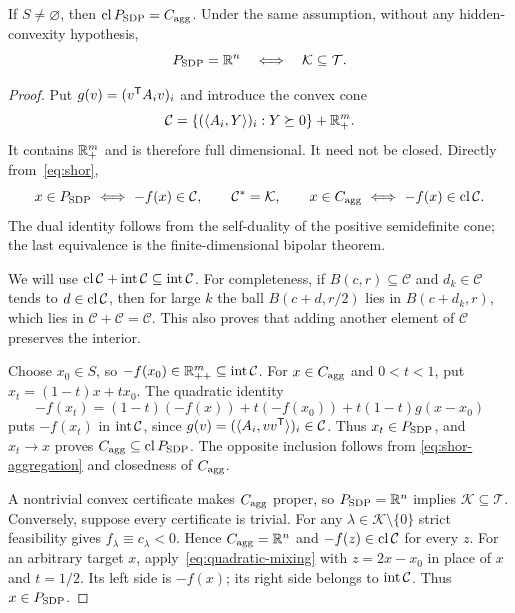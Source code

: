 \begin{proposition}\label{prop:shor-closure}
If $S\ne\varnothing$, then $\operatorname{cl} P_{\rm SDP}=C_{\rm agg}$. Under the same
assumption, without any hidden-convexity hypothesis,
\begin{equation}\label{eq:shor-whole}
 P_{\rm SDP}=\mathbb R^n\quad\Longleftrightarrow\quad
 \mathcal K\subseteq\mathcal T.
\end{equation}
\end{proposition}
\begin{proof}
Put $g(v)=(v^{\mathsf T} A_i v)_i$ and introduce the convex cone
\[
 \mathcal C=\{(\langle A_i,Y\rangle)_i:Y\succeq0\}+\mathbb R^m_+.
\]
It contains $\mathbb R^m_+$ and is therefore full dimensional. It need not
be closed. Directly from~\eqref{eq:shor},
\[
 x\in P_{\rm SDP}\ \Longleftrightarrow\ -f(x)\in\mathcal C,
 \qquad
 \mathcal C^*=\mathcal K,
 \qquad
 x\in C_{\rm agg}\ \Longleftrightarrow\ -f(x)\in\cl\mathcal C.
\]
The dual identity follows from the self-duality of the positive
semidefinite cone; the last equivalence is the finite-dimensional
bipolar theorem.

We will use
$\operatorname{cl}\mathcal C+\operatorname{int}\mathcal C\subseteq\operatorname{int}\mathcal C$.
For completeness, if $B(c,r)\subseteq\mathcal C$ and
$d_k\in\mathcal C$ tends to $d\in\operatorname{cl}\mathcal C$, then for large $k$
the ball $B(c+d,r/2)$ lies in $B(c+d_k,r)$, which lies in
$\mathcal C+\mathcal C=\mathcal C$. This also proves that adding
another element of $\mathcal C$ preserves the interior.

Choose $x_0\in S$, so $-f(x_0)\in\mathbb R^m_{++}\subseteq
\operatorname{int}\mathcal C$. For $x\in C_{\rm agg}$ and $0<t<1$, put
$x_t=(1-t)x+t x_0$. The quadratic identity
\begin{equation}\label{eq:quadratic-mixing}
 -f(x_t)=(1-t)(-f(x))+t(-f(x_0))
                         +t(1-t)g(x-x_0)
\end{equation}
puts $-f(x_t)$ in $\operatorname{int}\mathcal C$, since
$g(v)=(\langle A_i,vv^{\mathsf T}\rangle)_i\in\mathcal C$.
Thus $x_t\in P_{\rm SDP}$, and $x_t\to x$ proves
$C_{\rm agg}\subseteq\operatorname{cl} P_{\rm SDP}$. The opposite inclusion follows from
\eqref{eq:shor-aggregation} and closedness of $C_{\rm agg}$.

A nontrivial convex certificate makes $C_{\rm agg}$ proper, so
$P_{\rm SDP}=\mathbb R^n$ implies $\mathcal K\subseteq\mathcal T$.
Conversely, suppose every certificate is trivial. For any
$\lambda\in\mathcal K\setminus\{0\}$ strict feasibility gives
$f_\lambda\equiv c_\lambda<0$. Hence $C_{\rm agg}=\mathbb R^n$ and
$-f(z)\in\operatorname{cl}\mathcal C$ for every $z$.
For an arbitrary target $x$, apply~\eqref{eq:quadratic-mixing} with
$z=2x-x_0$ in place of $x$ and $t=1/2$. Its left side is $-f(x)$;
its right side belongs to $\operatorname{int}\mathcal C$. Thus $x\in P_{\rm SDP}$.
\end{proof}

